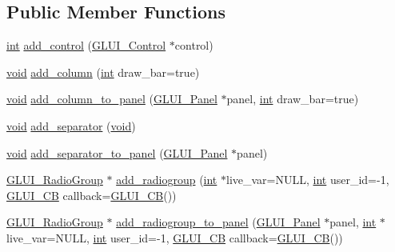 \subsection*{Public Member Functions}
\begin{DoxyCompactItemize}
\item 
\hyperlink{wglext_8h_a500a82aecba06f4550f6849b8099ca21}{int} \hyperlink{class_g_l_u_i_a94398f830a14babcd93ac109082a221e}{add\+\_\+control} (\hyperlink{class_g_l_u_i___control}{G\+L\+U\+I\+\_\+\+Control} $\ast$control)
\item 
\hyperlink{wglext_8h_a9e6b7f1933461ef318bb000d6bd13b83}{void} \hyperlink{class_g_l_u_i_a371273c28159a52e474d953101b462c8}{add\+\_\+column} (\hyperlink{wglext_8h_a500a82aecba06f4550f6849b8099ca21}{int} draw\+\_\+bar=true)
\item 
\hyperlink{wglext_8h_a9e6b7f1933461ef318bb000d6bd13b83}{void} \hyperlink{class_g_l_u_i_a4c9f42cf5ac0a3a859533f44211ea023}{add\+\_\+column\+\_\+to\+\_\+panel} (\hyperlink{class_g_l_u_i___panel}{G\+L\+U\+I\+\_\+\+Panel} $\ast$panel, \hyperlink{wglext_8h_a500a82aecba06f4550f6849b8099ca21}{int} draw\+\_\+bar=true)
\item 
\hyperlink{wglext_8h_a9e6b7f1933461ef318bb000d6bd13b83}{void} \hyperlink{class_g_l_u_i_a373d1d3fe27388c71d6d1b8767eb6590}{add\+\_\+separator} (\hyperlink{wglext_8h_a9e6b7f1933461ef318bb000d6bd13b83}{void})
\item 
\hyperlink{wglext_8h_a9e6b7f1933461ef318bb000d6bd13b83}{void} \hyperlink{class_g_l_u_i_aba9244b448b4b38e7c45ef95f7b1763a}{add\+\_\+separator\+\_\+to\+\_\+panel} (\hyperlink{class_g_l_u_i___panel}{G\+L\+U\+I\+\_\+\+Panel} $\ast$panel)
\item 
\hyperlink{class_g_l_u_i___radio_group}{G\+L\+U\+I\+\_\+\+Radio\+Group} $\ast$ \hyperlink{class_g_l_u_i_ae192f21b47b98c6496914638b74ea894}{add\+\_\+radiogroup} (\hyperlink{wglext_8h_a500a82aecba06f4550f6849b8099ca21}{int} $\ast$live\+\_\+var=N\+U\+L\+L, \hyperlink{wglext_8h_a500a82aecba06f4550f6849b8099ca21}{int} user\+\_\+id=-\/1, \hyperlink{class_g_l_u_i___c_b}{G\+L\+U\+I\+\_\+\+C\+B} callback=\hyperlink{class_g_l_u_i___c_b}{G\+L\+U\+I\+\_\+\+C\+B}())
\item 
\hyperlink{class_g_l_u_i___radio_group}{G\+L\+U\+I\+\_\+\+Radio\+Group} $\ast$ \hyperlink{class_g_l_u_i_ab6932d87d07a56e2508a8fdc5f448124}{add\+\_\+radiogroup\+\_\+to\+\_\+panel} (\hyperlink{class_g_l_u_i___panel}{G\+L\+U\+I\+\_\+\+Panel} $\ast$panel, \hyperlink{wglext_8h_a500a82aecba06f4550f6849b8099ca21}{int} $\ast$live\+\_\+var=N\+U\+L\+L, \hyperlink{wglext_8h_a500a82aecba06f4550f6849b8099ca21}{int} user\+\_\+id=-\/1, \hyperlink{class_g_l_u_i___c_b}{G\+L\+U\+I\+\_\+\+C\+B} callback=\hyperlink{class_g_l_u_i___c_b}{G\+L\+U\+I\+\_\+\+C\+B}())

\end{DoxyCompactItemize}
